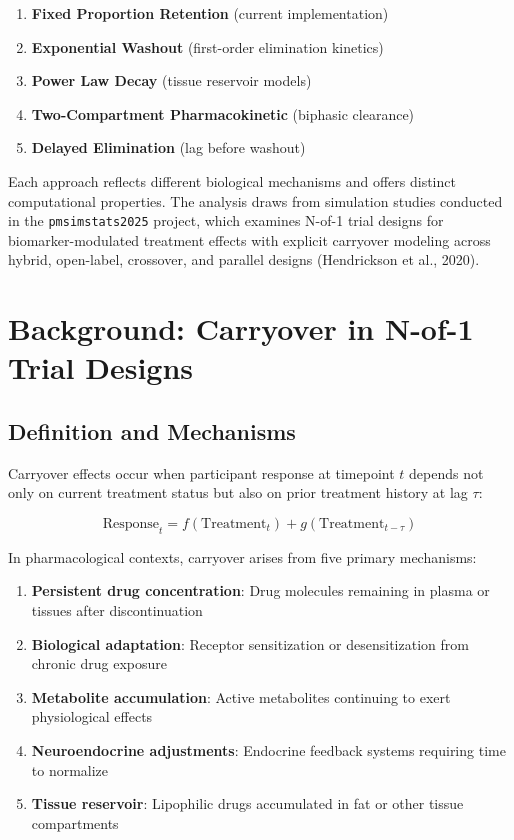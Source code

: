 \documentclass[11pt,a4paper]{article}
\begin{document}
\begin{enumerate}
  \item \textbf{Fixed Proportion Retention} (current implementation)
  \item \textbf{Exponential Washout} (first-order elimination kinetics)
  \item \textbf{Power Law Decay} (tissue reservoir models)
  \item \textbf{Two-Compartment Pharmacokinetic} (biphasic clearance)
  \item \textbf{Delayed Elimination} (lag before washout)
\end{enumerate}

Each approach reflects different biological mechanisms and offers distinct computational properties. The analysis draws from simulation studies conducted in the \texttt{pmsimstats2025} project, which examines N-of-1 trial designs for biomarker-modulated treatment effects with explicit carryover modeling across hybrid, open-label, crossover, and parallel designs (Hendrickson et al., 2020).

\section{Background: Carryover in N-of-1 Trial Designs}
\label{sec:background}

\subsection{Definition and Mechanisms}

Carryover effects occur when participant response at timepoint $t$ depends not only on current treatment status but also on prior treatment history at lag $\tau$:

\begin{equation}
  \text{Response}_t = f(\text{Treatment}_t) + g(\text{Treatment}_{t-\tau})
\end{equation}

In pharmacological contexts, carryover arises from five primary mechanisms:

\begin{enumerate}
  \item \textbf{Persistent drug concentration}: Drug molecules remaining in plasma or tissues after discontinuation
  \item \textbf{Biological adaptation}: Receptor sensitization or desensitization from chronic drug exposure
  \item \textbf{Metabolite accumulation}: Active metabolites continuing to exert physiological effects
  \item \textbf{Neuroendocrine adjustments}: Endocrine feedback systems requiring time to normalize
  \item \textbf{Tissue reservoir}: Lipophilic drugs accumulated in fat or other tissue compartments
\end{enumerate}
\end{document}
